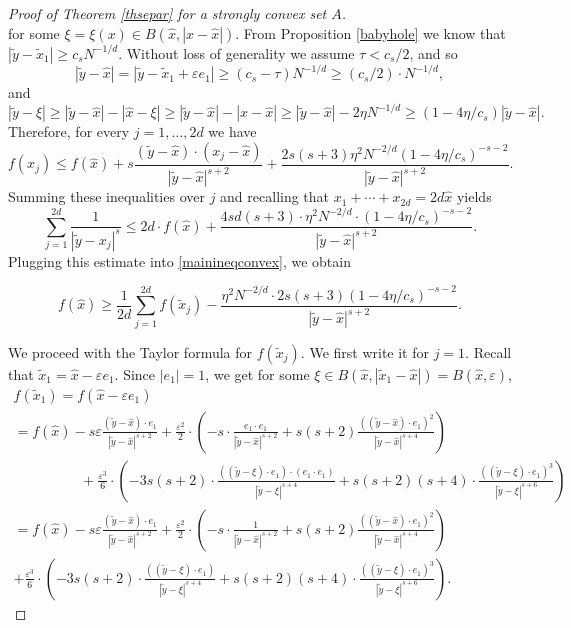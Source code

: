 \documentclass[12pt]{amsart}
\theoremstyle{definition}
\def\sli{\sum\limits}
\def\ep{\varepsilon}
\newcommand{\1}{\mathbf{1}}
\begin{document}
\begin{proof}[Proof of Theorem \ref{thsepar} for a strongly convex set $A$]
$$$$
for some $\xi=\xi(x)\in B(\hat{x}, |x-\hat{x}|)$. From Proposition \ref{babyhole} we know that $|\tilde{y}-\tilde{x}_1|\geqslant c_s N^{-1/d}$. Without loss of generality we assume $\tau<c_s/2$, and so
\begin{equation}\label{trumpumpum}
|\tilde{y}-\hat{x}|=|\tilde{y}-\tilde{x}_1+\ep e_1|\geqslant (c_s-\tau)N^{-1/d}\geqslant (c_s/2)\cdot N^{-1/d},
\end{equation}
and
$$
|\tilde y-\xi|\geqslant |\tilde y-\hat{x}|-|\hat{x}-\xi|\geqslant |\tilde y - \hat{x}|-|x-\hat{x}|\geqslant |\tilde y - \hat{x}|-2\eta N^{-1/d} \geqslant (1-4\eta/c_s)|\tilde y-\hat{x}|.
$$
Therefore, for every $j=1,\ldots, 2d$ we have
$$
f(x_j)\leqslant f(\hat{x})+s\frac{(\tilde y-\hat{x})\cdot(x_j-\hat{x})}{|\tilde y-\hat{x}|^{s+2}} + \frac{2s(s+3)\eta^2 N^{-2/d}(1-4\eta/c_s)^{-s-2}}{|\tilde y-\hat{x}|^{s+2}}.
$$
Summing these inequalities over $j$ and recalling that $x_1+\cdots+x_{2d}=2d\hat{x}$ yields
\begin{equation}
\sli_{j=1}^{2d}\frac{1}{|\tilde y-x_j|^s} \leqslant 2d\cdot f(\hat{x}) +  \frac{4sd (s+3)\cdot \eta^2 N^{-2/d}\cdot(1-4\eta/c_s)^{-s-2}}{|\tilde y-\hat{x}|^{s+2}}.
\end{equation}
Plugging this estimate into \eqref{mainineqconvex}, we obtain

\begin{equation}\label{mainineqconvex2}
f(\hat{x}) \geqslant \frac{1}{2d}\sli_{j=1}^{2d}f(\tilde{x}_j) - \frac{\eta^2 N^{-2/d}\cdot 2s (s+3)(1-4\eta/c_s)^{-s-2}} {|\tilde y-\hat{x}|^{s+2}}.
 \end{equation}

We proceed with the Taylor formula for $f(\tilde x_j)$. We first write it for $j=1$. Recall that $\tilde{x}_1 = \hat{x}-\ep e_1$.  Since $|e_1|=1$, we get for some $\xi \in B(\hat{x}, |\tilde x_1-\hat{x}|) = B(\hat{x}, \ep)$,
\begin{multline}\label{supertaylorconvex}
f(\tilde x_1)=f(\hat{x}-\ep e_1) \\= f(\hat{x})-s\ep \frac{(\tilde y-\hat{x})\cdot e_1}{|\tilde y-\hat{x}|^{s+2}} +
\frac{\ep^2}2 \cdot \left(-s\cdot \frac{e_1\cdot e_1}{|\tilde y-\hat{x}|^{s+2}}+s(s+2)\frac{((\tilde y-\hat{x})\cdot e_1)^2}{|\tilde y-\hat{x}|^{s+4}}\right) \\
\hspace{2cm}+\frac{\ep^3}6 \cdot \left(-3s(s+2)\cdot \frac{((\tilde y-\xi)\cdot e_1)\cdot (e_1\cdot e_1)}{|\tilde y-\xi|^{s+4}} + s(s+2)(s+4)\cdot \frac{((\tilde y-\xi)\cdot e_1)^3}{|\tilde y-\xi|^{s+6}}\right)  \\
=f(\hat{x})-s\ep \frac{(\tilde y-\hat{x})\cdot e_1}{|\tilde y-\hat{x}|^{s+2}} +
\frac{\ep^2}2 \cdot \left(-s\cdot \frac{1}{|\tilde y-\hat{x}|^{s+2}}+s(s+2)\frac{((\tilde y-\hat{x})\cdot e_1)^2}{|\tilde y-\hat{x}|^{s+4}}\right)  \\
+\frac{\ep^3}6 \cdot \left(-3s(s+2)\cdot \frac{((\tilde y-\xi)\cdot e_1)}{|\tilde y-\xi|^{s+4}} + s(s+2)(s+4)\cdot \frac{((\tilde y-\xi)\cdot e_1)^3}{|\tilde y-\xi|^{s+6}}\right)
.
\end{multline}


\end{proof}
\end{document}
